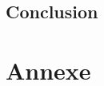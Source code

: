 \documentclass[a4paper, 11pt, oneside, oldfontcommands]{memoir}
\begin{document}

\chapter*{Conclusion}
\newpage


\part*{Annexe}
\appendix
\nocite{*}







\newpage
 \listoffigures
 \printindex
 
  
\end{document}
